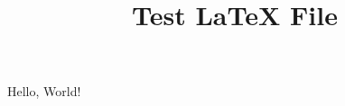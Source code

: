 \documentclass{article}
\title{Test LaTeX File}
\begin{document}
\maketitle

Hello, World!
\end{document}
